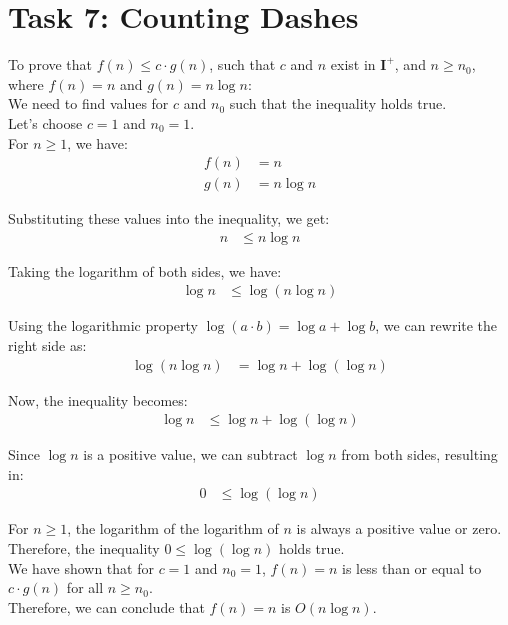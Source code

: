  \chapter{Task 7: Counting Dashes}

To prove that $f(n) \leq c \cdot g(n)$, such that $c$ and $n$ exist in $\mathbf{I}^+$, and $n \geq n_0$, where $f(n) = n$ and $g(n) = n \log n$:\\

We need to find values for $c$ and $n_0$ such that the inequality holds true.\\

Let's choose $c = 1$ and $n_0 = 1$.\\

For $n \geq 1$, we have: 
\begin{align*}
f(n) &= n \\
g(n) &= n \log n
\end{align*}

Substituting these values into the inequality, we get:
\begin{align*}
n &\leq n \log n
\end{align*}

Taking the logarithm of both sides, we have:
\begin{align*}
\log n &\leq \log(n \log n)
\end{align*}

Using the logarithmic property $\log(a \cdot b) = \log a + \log b$, we can rewrite the right side as:
\begin{align*}
\log(n \log n) &= \log n + \log(\log n)
\end{align*}

Now, the inequality becomes:
\begin{align*}
\log n &\leq \log n + \log(\log n)
\end{align*}

Since $\log n$ is a positive value, we can subtract $\log n$ from both sides, resulting in:
\begin{align*}
0 &\leq \log(\log n)
\end{align*}

For $n \geq 1$, the logarithm of the logarithm of $n$ is always a positive value or zero. Therefore, the inequality $0 \leq \log(\log n)$ holds true.\\

We have shown that for $c = 1$ and $n_0 = 1$, $f(n) = n$ is less than or equal to $c \cdot g(n)$ for all $n \geq n_0$.\\
Therefore, we can conclude that $f(n) = n$ is $O(n \log n)$.






